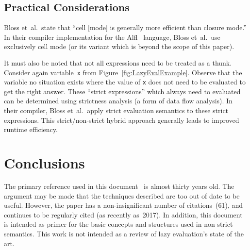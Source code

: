 \documentclass[11pt]{article}
\begin{document}
\subsection{Practical Considerations}

Bloss et~al.\ state that ``cell [mode] is generally more efficient than closure mode.''  In their compiler implementation for the Alfl~\cite{Alfl} language, Bloss et~al.\ use exclusively cell mode (or its variant which is beyond the scope of this paper).

It must also be noted that not all expressions need to be treated as a thunk.  Consider again variable~\texttt{x} from Figure~\ref{fig:LazyEvalExample}.  Observe that the variable no situation exists where the value of \texttt{x} does not need to be evaluated to get the right answer.  These ``strict expressions'' which always need to evaluated can be determined using strictness analysis (a form of data flow analysis).  In their compiler, Bloss et~al.\ apply strict evaluation semantics to these strict expressions.  This strict/non-strict hybrid approach generally leads to improved runtime efficiency.

\section{Conclusions}\label{sec:Conclusions}

The primary reference used in this document~\cite{Bloss:1988} is almost thirty years old.  The argument may be made that the techniques described are too out of date to be useful.  However, the paper has a non-insignificant number of citations~(61), and continues to be regularly cited (as recently as~2017).  In addition, this document is intended as primer for the basic concepts and structures used in non-strict semantics. This work is not intended as a review of lazy evaluation's state of the art.



\end{document}
